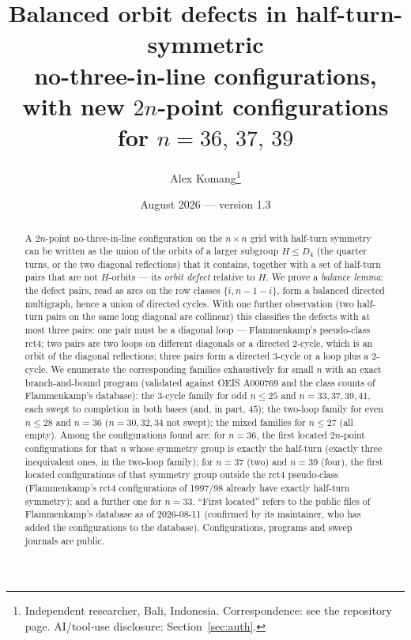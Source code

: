 \documentclass[11pt]{article}
\title{Balanced orbit defects in half-turn-symmetric\\ no-three-in-line configurations,\\
with new $2n$-point configurations for $n=36,\,37,\,39$}
\author{Alex Komang\thanks{Independent researcher, Bali, Indonesia.  Correspondence: see the repository page.
AI/tool-use disclosure: Section~\ref{sec:auth}.}}
\date{August 2026 --- version 1.3}
\theoremstyle{remark}
\newcommand{\Dfour}{D_4}
\begin{document}
\maketitle

\begin{abstract}
A $2n$-point no-three-in-line configuration on the $n\times n$ grid with half-turn symmetry can be written as the union
of the orbits of a larger subgroup $H\le\Dfour$ (the quarter turns, or the two diagonal reflections) that it contains,
together with a set of half-turn pairs that are not $H$-orbits --- its \emph{orbit defect} relative to $H$.  We prove a
\emph{balance lemma}: the defect pairs, read as arcs on the row classes $\{i,n-1-i\}$, form a balanced directed
multigraph, hence a union of directed cycles.  With one further observation (two half-turn pairs on the same long
diagonal are collinear) this classifies the defects with at most three pairs: one pair must be a diagonal loop ---
Flammenkamp's pseudo-class rct4; two pairs are two loops on different diagonals or a directed $2$-cycle, which is an
orbit of the diagonal reflections; three pairs form a directed $3$-cycle or a loop plus a $2$-cycle.  We enumerate the
corresponding families exhaustively for small $n$ with an exact branch-and-bound program (validated against OEIS A000769
and the class counts of Flammenkamp's database): the $3$-cycle family for odd $n\le25$ and $n=33,37,39,41$, each swept to completion in both bases (and, in part, $45$); the two-loop family for even $n\le28$ and $n=36$ ($n=30,32,34$ not swept); the mixed families for $n\le27$ (all empty).  Among the
configurations found are: for $n=36$, the first located $2n$-point configurations for that $n$ whose symmetry group is exactly the
half-turn (exactly three inequivalent ones, in the two-loop family); for $n=37$ (two) and $n=39$ (four), the first located configurations of that
symmetry group outside the rct4 pseudo-class (Flammenkamp's rct4 configurations of 1997/98 already have exactly
half-turn symmetry); and a further one for $n=33$.  ``First located'' refers to the public files of Flammenkamp's
database as of 2026-08-11 (confirmed by its maintainer, who has added the configurations to the database).  Configurations,
programs and sweep journals are public.
\end{abstract}
\end{document}
